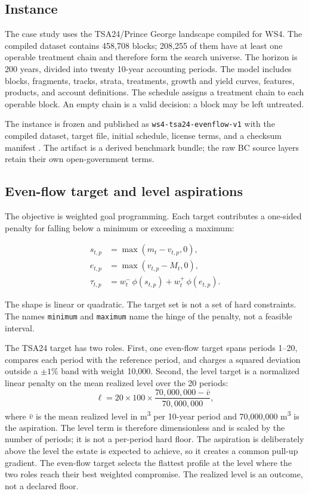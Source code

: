 \documentclass[preprint,11pt]{elsarticle}
\begin{document}
\subsection{Instance}\label{instance}

The case study uses the TSA24/Prince George landscape compiled for WS4. The compiled dataset contains 458,708 blocks; 208,255 of them have at least one operable treatment chain and therefore form the search universe. The horizon is 200 years, divided into twenty 10-year accounting periods. The model includes blocks, fragments, tracks, strata, treatments, growth and yield curves, features, products, and account definitions. The schedule assigns a treatment chain to each operable block. An empty chain is a valid decision: a block may be left untreated.

The instance is frozen and published as \texttt{ws4-tsa24-evenflow-v1} with the compiled dataset, target file, initial schedule, license terms, and a checksum manifest \citep{tsa24artifact}. The artifact is a derived benchmark bundle; the raw BC source layers retain their own open-government terms.

\subsection{Even-flow target and level aspirations}\label{even-flow-target-and-level-aspirations}

The objective is weighted goal programming. Each target contributes a one-sided penalty for falling below a minimum or exceeding a maximum:

\begin{align}
s_{t,p} &= \max(m_t - v_{t,p}, 0),\\
e_{t,p} &= \max(v_{t,p} - M_t, 0),\\
\tau_{t,p} &= w^-_t\,\phi(s_{t,p}) + w^+_t\,\phi(e_{t,p}).
\end{align}

The shape is linear or quadratic. The target set is not a set of hard constraints. The names \texttt{minimum} and \texttt{maximum} name the hinge of the penalty, not a feasible interval.

The TSA24 target has two roles. First, one even-flow target spans periods 1--20, compares each period with the reference period, and charges a squared deviation outside a $\pm1\%$ band with weight 10,000. Second, the level target is a normalized linear penalty on the mean realized level over the 20 periods:
\[
\ell = 20 \times 100 \times \frac{70{,}000{,}000 - \bar v}{70{,}000{,}000},
\]
where $\bar v$ is the mean realized level in m\textsuperscript{3} per 10-year period and 70,000,000 m\textsuperscript{3} is the aspiration. The level term is therefore dimensionless and is scaled by the number of periods; it is not a per-period hard floor. The aspiration is deliberately above the level the estate is expected to achieve, so it creates a common pull-up gradient. The even-flow target selects the flattest profile at the level where the two roles reach their best weighted compromise. The realized level is an outcome, not a declared floor.
\end{document}
